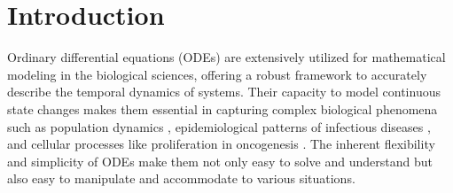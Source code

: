\documentclass[12pt]{article}
\begin{document}
\section{Introduction}
Ordinary differential equations (ODEs) are extensively utilized for mathematical modeling in the biological sciences, offering a robust framework to accurately describe the temporal dynamics of systems. Their capacity to model continuous state changes makes them essential in capturing complex biological phenomena such as population dynamics \cite{salisbury2011mathematical}\cite{sego2021generation}, epidemiological patterns of infectious diseases \cite{Anderson1991}\cite{Diekmann2000}\cite{Feng2016}, and cellular processes like proliferation in oncogenesis \cite{baker1998modelling}\cite{jarrett2018mathematical}. The inherent flexibility and simplicity of ODEs make them not only easy to solve and understand but also easy to manipulate and accommodate to various situations.
\end{document}
